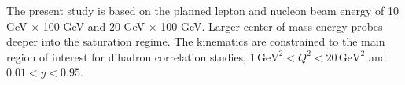 %
%
%
%



The present study is based on the planned lepton and nucleon beam energy of 10
GeV $\times$ 100 GeV and 20 GeV $\times$ 100 GeV. Larger center of mass energy probes deeper into the saturation regime. The kinematics are constrained
to the main region of interest for dihadron correlation studies,
$1\, \textrm{GeV}^{2}<Q^{2}<20 \, \textrm{GeV}^{2}$ and
$0.01<y<0.95$. 

